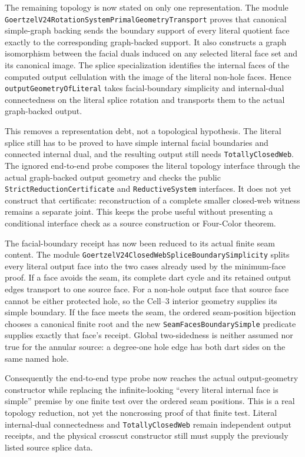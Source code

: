 \documentclass[11pt]{article}
\theoremstyle{definition}
\begin{document}
The remaining topology is now stated on only one representation.  The module
\texttt{GoertzelV24RotationSystemPrimalGeometryTransport} proves that canonical
simple-graph backing sends the boundary support of every literal quotient face
exactly to the corresponding graph-backed support.  It also constructs a graph
isomorphism between the facial duals induced on any selected literal face set
and its canonical image.  The splice specialization identifies the internal
faces of the computed output cellulation with the image of the literal
non-hole faces.  Hence \texttt{outputGeometryOfLiteral} takes facial-boundary
simplicity and internal-dual connectedness on the literal splice rotation and
transports them to the actual graph-backed output.

This removes a representation debt, not a topological hypothesis.  The
literal splice still has to be proved to have simple internal facial
boundaries and connected internal dual, and the resulting output still needs
\texttt{TotallyClosedWeb}.  The ignored end-to-end probe composes the literal
topology interface through the actual graph-backed output geometry and checks
the public \texttt{StrictReductionCertificate} and \texttt{ReductiveSystem}
interfaces.  It does not yet construct that certificate: reconstruction of a
complete smaller closed-web witness remains a separate joint.  This keeps the
probe useful without presenting a conditional interface check as a source
construction or Four-Color theorem.

The facial-boundary receipt has now been reduced to its actual finite seam
content.  The module
\texttt{GoertzelV24ClosedWebSpliceBoundarySimplicity} splits every literal
output face into the two cases already used by the minimum-face proof.  If a
face avoids the seam, its complete dart cycle and its retained output edges
transport to one source face.  For a non-hole output face that source face
cannot be either protected hole, so the Cell--3 interior geometry supplies
its simple boundary.  If the face meets the seam, the ordered seam-position
bijection chooses a canonical finite root and the new
\texttt{SeamFacesBoundarySimple} predicate supplies exactly that face's
receipt.  Global two-sidedness is neither assumed nor true for the annular
source: a degree-one hole edge has both dart sides on the same named hole.

Consequently the end-to-end type probe now reaches the actual output-geometry
constructor while replacing the infinite-looking ``every literal internal
face is simple'' premise by one finite test over the ordered seam positions.
This is a real topology reduction, not yet the noncrossing proof of that finite
test.  Literal internal-dual connectedness and \texttt{TotallyClosedWeb}
remain independent output receipts, and the physical crosscut constructor
still must supply the previously listed source splice data.
\end{document}
